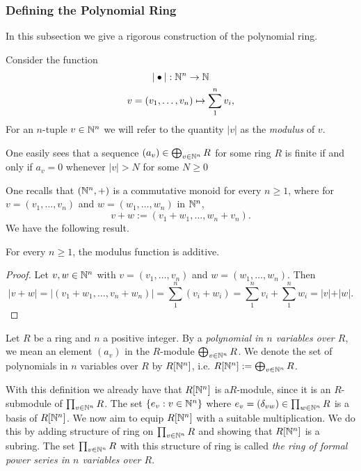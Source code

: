 \subsubsection{Defining the Polynomial Ring} 
In this subsection we give a rigorous construction of the polynomial ring. 
\begin{definition}
    Consider the function 
    \begin{gather*}
        \vert \bullet \vert : \mathbb{N}^n \rightarrow \mathbb{N}\\
        v=(v_1,\dots,v_n) \mapsto \sum_1^n v_i,
    \end{gather*}
    For an $n$-tuple $v\in \mathbb{N}^n$ we will refer to the quantity $\vert v\vert$ as the \textit{modulus} of $v$.
\end{definition}
\begin{remark}
    One easily sees that a sequence $(a_v) \in \bigoplus_{v\in \mathbb{N}^n} R$ for some ring $R$ is finite if and only if $a_v = 0$ whenever $\vert v\vert > N$ for some $N\geq 0$
\end{remark}
One recalls that $(\mathbb{N}^n,+)$ is a commutative monoid for every $n\geq 1$, where for $v=(v_1,\dots,v_n)$ and $w = (w_1,\dots,w_n)$ in $\mathbb{N}^n$,
$$v+w := (v_1+w_1,\dots,w_n+v_n).$$ 
We have the following result. 
\begin{lemma}\label{ModulusFunctionIsAdditive}
    For every $n\geq 1$, the modulus function is additive.
\end{lemma}
\begin{proof}
    Let $v,w\in \mathbb{N}^n$ with $v=(v_1,\dots,v_n)$ and $w=(w_1,\dots,w_n)$. Then
    $$\vert v+w\vert = \vert (v_1+w_1,\dots,v_n+w_n)\vert = \sum_1^n (v_i+w_i) = \sum_1^n v_i + \sum_1^n w_i = \vert v\vert +\vert w\vert.$$
\end{proof}
\begin{definition}
    Let $R$ be a ring and $n$ a positive integer. By a \textit{polynomial in $n$ variables over $R$}, we mean an element $(a_v)$ in the $R$-module $\bigoplus_{v\in \mathbb{N}^n} R$. We denote the set of polynomials in $n$ variables over $R$ by $R[\mathbb{N}^n]$, i.e. $R[\mathbb{N}^n] := \bigoplus_{v\in \mathbb{N}^n} R$.
\end{definition}
With this definition we already have that $R[\mathbb{N}^n]$ is a$R$-module, since it is an $R$-submodule of $\prod_{v\in \mathbb{N}^n} R$. The set $\{e_v : v\in \mathbb{N}^n\}$ where $e_v = (\delta_{vw})\in \prod_{w\in \mathbb{N}^n} R$ is a basis of $R[\mathbb{N}^n]$. We now aim to equip $R[\mathbb{N}^n]$ with a suitable multiplication. We do this by adding structure of ring on $\prod_{v\in \mathbb{N}^n} R$ and showing that $R[\mathbb{N}^n]$ is a subring. The set $\prod_{v\in \mathbb{N}^n} R$ with this structure of ring is called \textit{the ring of formal power series in $n$ variables over $R$}. 
